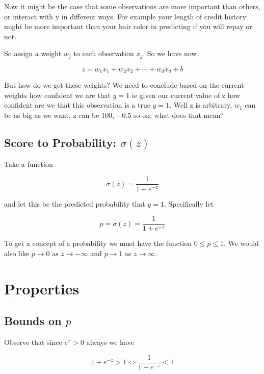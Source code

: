 \documentclass{article}
\theoremstyle{remark}
\begin{document}
Now it might be the case that some observations are more important
than others, or interact with y in different ways. For example your length of credit
history might be more important than your hair color in predicting if you will
repay or not. 

So assign a weight $w_j$ to each observation $x_j$. So we have now

\begin{equation}
    z = w_1x_1 + w_2x_2 + \cdots + w_dx_d + b
\end{equation}

But how do we get these weights? We need to conclude based on the current weights
how confident we are that $y = 1$ ie given our current value of z how confident are we
that this observation is a true $y = 1$. Well z is arbitrary, $w_1$ can be as big as we want,
z can be $100$, $-0.5$ so on; what does that mean?

\subsection{Score to Probability: $\sigma(z)$}

Take a function 

\begin{equation}
    \sigma(z) = \frac{1}{1 + e^{-z}}
\end{equation}

and let this be the predicted probability that $y = 1$. 
Specifically let 

\begin{equation}
    p = \sigma(z) = \frac{1}{1 + e^{-z}}
\end{equation}

To get a concept of a probability we must have the function $0 \leq p \leq 1$. We would
also like $p \to 0 \text{ as } z \to -\infty$ and $p \to 1 \text{ as } z \to \infty$.


\section{Properties}

\subsection{Bounds on $p$}

Observe that since $e^{x} > 0$ always we have

\begin{equation*}
1 + e^{-z} > 1 \iff \frac{1}{1 + e^{-z}} < 1
\end{equation*}
\end{document}
